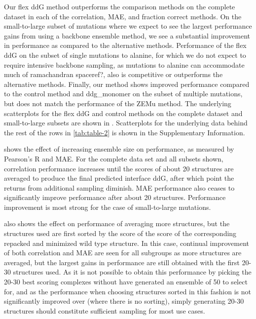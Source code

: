 Our flex ddG method outperforms the comparison methods on the complete dataset in each of the correlation, MAE, and fraction correct methods. On the small-to-large subset of mutations where we expect to see the largest performance gains from using a backbone ensemble method, we see a substantial improvement in performance as compared to the alternative methods. Performance of the flex ddG on the subset of single mutations to alanine, for which we do not expect to require intensive backbone sampling, as mutations to alanine can accommodate much of ramachandran space{ref?}, also is competitive or outperforms the alternative methods. Finally, our method shows improved performance compared to the control method and ddg\_monomer on the subset of multiple mutations, but does not match the performance of the ZEMu method. The underlying scatterplots for the flex ddG and control methods on the complete dataset and small-to-large subsets are shown in \cite{fig:figure-1}. Scatterplots for the underlying data behind the rest of the rows in \ref{tab:table-2} is shown in the Supplementary Information.

\cite{fig:fig4-id} shows the effect of increasing ensemble size on performance, as measured by Pearson’s R and MAE. For the complete data set and all subsets shown, correlation performance increases until the scores of about 20 structures are averaged to produce the final predicted interface ddG, after which point the returns from additional sampling diminish. MAE performance also ceases to significantly improve performance after about 20 structures. Performance improvement is most strong for the case of small-to-large mutations.

\cite{fig:fig4-WildTypeComplex} also shows the effect on performance of averaging more structures, but the structures used are first sorted by the score of the score of the corresponding repacked and minimized wild type structure. In this case, continual improvement of both correlation and MAE are seen for all subgroups as more structures are averaged, but the largest gains in performance are still obtained with the first 20-30 structures used. As it is not possible to obtain this performance by picking the 20-30 best scoring complexes without have generated an ensemble of 50 to select for, and as the performance when choosing structures sorted in this fashion is not significantly improved over \cite{fig:fig4-id} (where there is no sorting), simply generating 20-30 structures should constitute sufficient sampling for most use cases.


